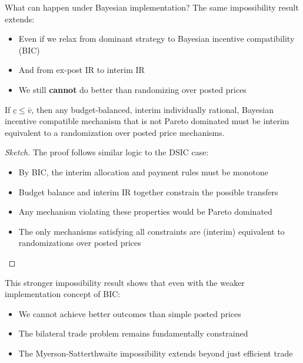 \documentclass[11pt]{elegantbook_2}
\begin{document}
\begin{remark}
    What can happen under Bayesian implementation? The same impossibility result extends:
    \begin{itemize}
        \item Even if we relax from dominant strategy to Bayesian incentive compatibility (BIC)
        \item And from ex-post IR to interim IR
        \item We still \textbf{cannot} do better than randomizing over posted prices
    \end{itemize}
\end{remark}

\begin{theorem}
    If $\underline{c} \leq \bar{v}$, then any budget-balanced, interim individually rational, Bayesian incentive compatible mechanism that is not Pareto dominated must be interim equivalent to a randomization over posted price mechanisms.
\end{theorem}

\begin{proof}[Sketch]
    The proof follows similar logic to the DSIC case:
    \begin{itemize}
        \item By BIC, the interim allocation and payment rules must be monotone
        \item Budget balance and interim IR together constrain the possible transfers
        \item Any mechanism violating these properties would be Pareto dominated
        \item The only mechanisms satisfying all constraints are (interim) equivalent to randomizations over posted prices
    \end{itemize}
\end{proof}


This stronger impossibility result shows that even with the weaker implementation concept of BIC:
\begin{itemize}
    \item We cannot achieve better outcomes than simple posted prices
    \item The bilateral trade problem remains fundamentally constrained
    \item The Myerson-Satterthwaite impossibility extends beyond just efficient trade
\end{itemize}
\end{document}
